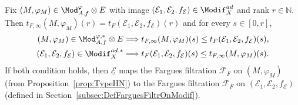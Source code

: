 \begin{prop}\label{prop:SpecialSubCats}
Fix $(M,\varphi_{M})\in\Mod_{A,f}^{\varphi}\otimes E$ with image $(\mathcal{E}_{1},\mathcal{E}_{2},f_{\mathcal{E}})\in\Modif_{X}^{ad}$ and rank $r\in\mathbb{N}$. Then $t_{F,\infty}(M,\varphi_{M})(r)=t_{F}(\mathcal{E}_{1},\mathcal{E}_{2},f_{\mathcal{E}})(r)$ and for every $s\in[0,r]$,
\begin{align*}
(M,\varphi_{M})\in\Mod_{A,f}^{\varphi,\ast}\otimes E & \Longrightarrow t_{F,\infty}(M,\varphi_{M})(s)\leq t_{F}(\mathcal{E}_{1},\mathcal{E}_{2},f_{\mathcal{E}})(s),\\
(\mathcal{E}_{1},\mathcal{E}_{2},f_{\mathcal{E}})\in\Modif_{X}^{ad,\ast} & \Longrightarrow t_{F}(\mathcal{E}_{1},\mathcal{E}_{2},f_{\mathcal{E}})(s)\leq t_{F,\infty}(M,\varphi_{M})(s).
\end{align*}
If both condition holds, then $\underline{\mathcal{E}}$ maps the Fargues filtration $\mathcal{F}_{F}$ on $(M,\varphi_{M})$ (from Proposition~\ref{prop:TypeHN}) to the Fargues filtration $\mathcal{F}_{F}$ on $(\mathcal{E}_{1},\mathcal{E}_{2},f_{\mathcal{E}})$ (defined in Section~\ref{subsec:DefFarguesFiltrOnModif}).
\end{prop}

